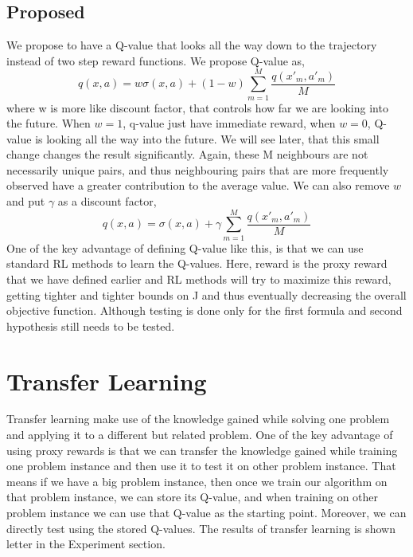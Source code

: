 \subsection{Proposed}
We propose to have a Q-value that looks all the way down to the trajectory instead of 
two step reward functions. We propose Q-value as,
$$ q(x,a) = w\sigma(x,a) + (1-w)\sum_{m=1}^{M}\frac{q(x'_m, a'_m)}{M }  $$
where w is more like discount factor, that controls how far we are looking into the future. 
When $w = 1$, q-value just have immediate reward, when $w = 0$, Q-value is looking all the way into the future.
We will see later, that this small change changes the result significantly.
Again, these M neighbours are not necessarily unique pairs, and thus 
neighbouring pairs that are more frequently observed have a greater contribution to the average value.
We can also remove $w$ and put $\gamma$ as a discount factor, 
$$ q(x,a) = \sigma(x,a) + \gamma \sum_{m=1}^{M}\frac{q(x'_m, a'_m)}{M }  $$
One of the key advantage of defining Q-value like this,
is that we can use standard RL methods to learn the Q-values. Here, reward is the proxy reward that we 
have defined earlier and RL methods will try
to maximize this reward, getting tighter and tighter bounds on J and thus eventually decreasing 
the overall objective function. Although testing is done only for the first formula and second hypothesis 
still needs to be tested.

\section{Transfer Learning}
Transfer learning make use of the knowledge gained while solving one 
problem and applying it to a different but related problem. One of the key advantage of using 
proxy rewards is that we can transfer the knowledge gained while training one problem instance and then 
use it to test it on other problem instance. That means if we have a big problem instance, then once we train 
our algorithm on that problem instance, we can store its Q-value, and when training on other problem instance
we can use that Q-value as the starting point. Moreover, we can directly test using the stored Q-values.
The results of transfer learning is shown letter in the Experiment section.